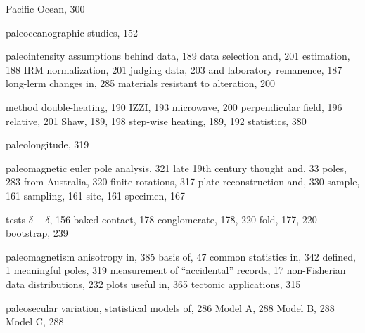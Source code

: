 \documentclass[,plain]{tauxe}
\begin{document}
\begin{theindex}
  \indexspace

  \item Pacific Ocean, 300
  \item paleoceanographic studies, 152
    
  \item paleointensity
    \subitem assumptions behind data, 189
    \subitem data selection and, 201
    \subitem estimation, 188
    \subitem IRM normalization, 201
    \subitem judging data, 203
    \subitem and laboratory remanence, 187
    \subitem long-lerm changes in, 285
	\subitem materials resistant to alteration, 200
    
  \subitem method
    \subsubitem double-heating, 190
    \subsubitem IZZI, 193
    \subsubitem microwave, 200
    \subsubitem perpendicular field, 196
    \subsubitem relative, 201
    \subsubitem Shaw, 189, 198
    \subsubitem step-wise heating, 189, 192
  \subitem  statistics, 380
  \item paleolongitude, 319
  \item paleomagnetic
    \subitem euler pole analysis, 321
    \subitem late 19th century thought and, 33
    \subitem poles, 283
		\subsubitem from Australia, 320
		\subsubitem finite rotations, 317
		\subsubitem plate reconstruction and, 330
	\subitem sample, 161
    \subitem sampling, 161
    \subitem site, 161
    \subitem specimen, 167
    
  \subitem  tests
    \subsubitem $\delta-\delta$, 156
    \subsubitem baked contact, 178
    \subsubitem conglomerate, 178, 220
    \subsubitem fold, 177, 220
      \subsubitem bootstrap, 239
  

  \item paleomagnetism
    \subitem anisotropy in, 385
    \subitem basis of, 47
    \subitem common statistics in, 342
	\subitem  defined, 1
	\subitem meaningful poles, 319
    \subitem measurement of ``accidental'' records, 17
    \subitem non-Fisherian data distributions, 232
    \subitem plots useful in, 365
    \subitem tectonic applications, 315
  \item paleosecular variation, statistical models of, 286
	\subitem Model A, 288
	\subitem Model B, 288
	\subitem Model C, 288


\end{theindex}
\end{document}
